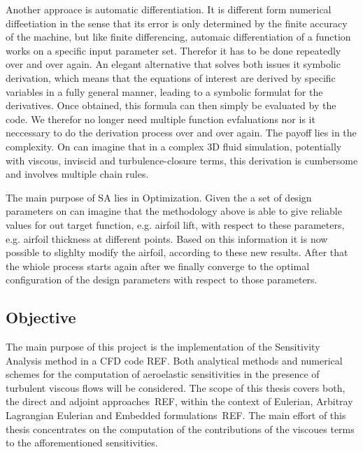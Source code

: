 Another approace is automatic differentiation. It is different form numerical diffeetiation in the sense that its error is only determined by the finite accuracy of the machine, but like finite differencing, automaic differentiation of a function works on a specific input parameter set. Therefor it has to be done repeatedly over and over again.
An elegant alternative that solves both issues it symbolic derivation, which means that the equations of interest are derived by specific variables in a fully general manner, leading to a symbolic formulat for the derivatives. Once obtained, this formula can then simply be evaluated by the code. We therefor no longer need multiple function evfaluations nor is it neccessary to do the derivation process over and over again. The payoff lies in the complexity. On can imagine that in a complex 3D fluid simulation, potentially with viscous, inviscid and turbulence-closure terms, this derivation is cumbersome and involves multiple chain rules.

The main purpose of SA lies in Optimization. Given the a set of design parameters on can imagine that the methodology above is able to give reliable values for out target function, e.g. airfoil lift, with respect to these parameters, e.g. airfoil thickness at different points. Based on this information it is now possible to slighlty modify the airfoil, according to these new results. After that the whiole process starts again after we finally converge to the optimal configuration of the design parameters with respect to those parameters.
\subsection{Objective}\label{sec:objective}

The main purpose of this project is the implementation of the Sensitivity Analysis method in a CFD code REF.
Both analytical methods and numerical schemes for the computation of
aeroelastic sensitivities in the presence of turbulent viscous flows will be considered.
The scope of this thesis covers both, the direct and adjoint approaches~REF, within the context of Eulerian, Arbitray Lagrangian Eulerian and Embedded formulations~REF.
The main effort of this thesis concentrates on the computation of the contributions of the viscoues terms to the afforementioned sensitivities.